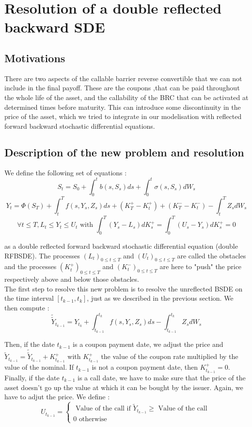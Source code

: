 \documentclass[a4paper,11pt,english]{book}
\begin{document}
\section{Resolution of a double reflected backward SDE}
\subsection{Motivations}
There are two aspects of the callable barrier reverse convertible that we can not include in the final payoff. These are the coupons ,that can be paid throughout the whole life of the asset, and the callability of the BRC that can be activated at determined times before maturity. This can introduce some discontinuity in the price of the asset, which we tried to integrate in our modelisation with reflected forward backward stochastic differential equations.
\subsection{Description of the new problem and resolution}
We define the following set of equations :
$$S_{t}=S_{0} + \int_{0}^{t}b(s,S_{s})ds + \int_{0}^{t}\sigma(s,S_{s})dW_{s}$$
$$Y_{t}=\Phi(S_{T})+\int_{t}^{T}f(s,Y_{s},Z_{s})ds+(K_{T}^{+}-K_{t}^{+})+(K_{T}^{-}-K_{t}^{-})-\int_{t}^{T}Z_{s}dW_{s}$$
$$\forall t\leq T, L_{t}\leq Y_{t}\leq U_{t} \text{ with } \int_{0}^{T}(Y_{s}-L_{s})dK_{s}^{+}=\int_{0}^{T}(U_{s}-Y_{s})dK_{s}^{+}=0$$

as a double reflected forward backward stochastic differential equation (double RFBSDE).
The processes $(L_{t})_{0\leq t \leq T}$ and $(U_{t})_{0\leq t \leq T}$ are called the obstacles and the processes $(K_{t}^{+})_{0\leq t \leq T}$ and $(K_{t}^{-})_{0\leq t \leq T}$ are here to "push" the price respectively above and below those obstacles. \\

The first step to resolve this new problem is to resolve the unreflected BSDE on the time interval $[t_{k-1},t_{k}]$, just as we described in the previous section. We then compute : $$\widetilde{\widetilde{Y}}_{t_{k-1}}=Y_{t_{k}}+\int_{t_{k-1}}^{t_{k}}f(s,Y_{s},Z_{s})ds-\int_{t_{k-1}}^{t_{k}}Z_{s}dW_{s}$$

Then, if the date $t_{k-1}$ is a coupon payment date, we adjust the price and $\widetilde{Y}_{t_{k-1}}= \widetilde{\widetilde{Y}}_{t_{k-1}} + K_{t_{k-1}}^{+}$ with $K_{t_{k-1}}^{+}$ the value of the coupon rate multiplied by the value of the nominal. If $t_{k-1}$ is not a coupon payment date, then $K_{t_{k-1}}^{+}=0$. \\
Finally, if the date $t_{k-1}$ is a call date, we have to make sure that the price of the asset doesn't go up the value at which it can be bought by the issuer. Again, we have to adjut the price. We define :
$$U_{t_{k-1}}=\left\{
    \begin{array}{ll}
        \text{ Value of the call if } \widetilde{Y}_{t_{k-1}}\geq \text{ Value of the call }\\
        0 \text{ otherwise }
    \end{array}
\right.$$
\end{document}

